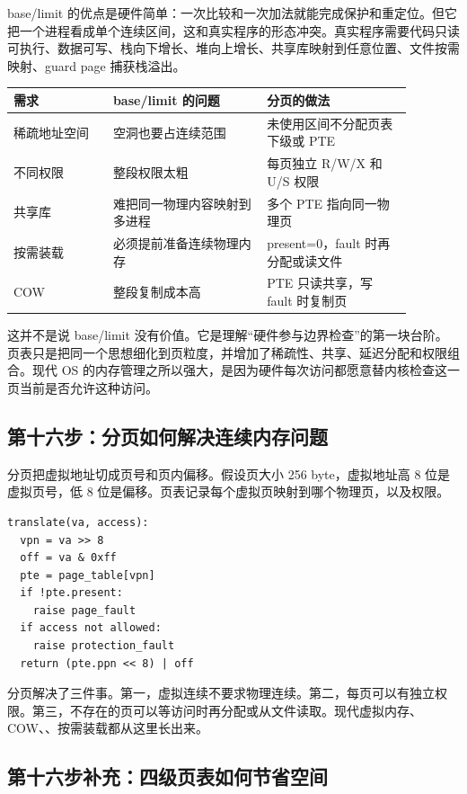 base/limit 的优点是硬件简单：一次比较和一次加法就能完成保护和重定位。但它把一个进程看成单个连续区间，这和真实程序的形态冲突。真实程序需要代码只读可执行、数据可写、栈向下增长、堆向上增长、共享库映射到任意位置、文件按需映射、guard page 捕获栈溢出。

\begin{longtable}{p{0.22\linewidth}p{0.34\linewidth}p{0.32\linewidth}}
\toprule
需求 & base/limit 的问题 & 分页的做法 \\
\midrule
稀疏地址空间 & 空洞也要占连续范围 & 未使用区间不分配页表下级或 PTE \\
不同权限 & 整段权限太粗 & 每页独立 R/W/X 和 U/S 权限 \\
共享库 & 难把同一物理内容映射到多进程 & 多个 PTE 指向同一物理页 \\
按需装载 & 必须提前准备连续物理内存 & present=0，fault 时再分配或读文件 \\
COW & 整段复制成本高 & PTE 只读共享，写 fault 时复制页 \\
\bottomrule
\end{longtable}

这并不是说 base/limit 没有价值。它是理解“硬件参与边界检查”的第一块台阶。页表只是把同一个思想细化到页粒度，并增加了稀疏性、共享、延迟分配和权限组合。现代 OS 的内存管理之所以强大，是因为硬件每次访问都愿意替内核检查这一页当前是否允许这种访问。

\subsection{第十六步：分页如何解决连续内存问题}

分页把虚拟地址切成页号和页内偏移。假设页大小 256 byte，虚拟地址高 8 位是虚拟页号，低 8 位是偏移。页表记录每个虚拟页映射到哪个物理页，以及权限。

\begin{lstlisting}
translate(va, access):
  vpn = va >> 8
  off = va & 0xff
  pte = page_table[vpn]
  if !pte.present:
    raise page_fault
  if access not allowed:
    raise protection_fault
  return (pte.ppn << 8) | off
\end{lstlisting}

分页解决了三件事。第一，虚拟连续不要求物理连续。第二，每页可以有独立权限。第三，不存在的页可以等访问时再分配或从文件读取。现代虚拟内存、COW、、按需装载都从这里长出来。

\subsection{第十六步补充：四级页表如何节省空间}

